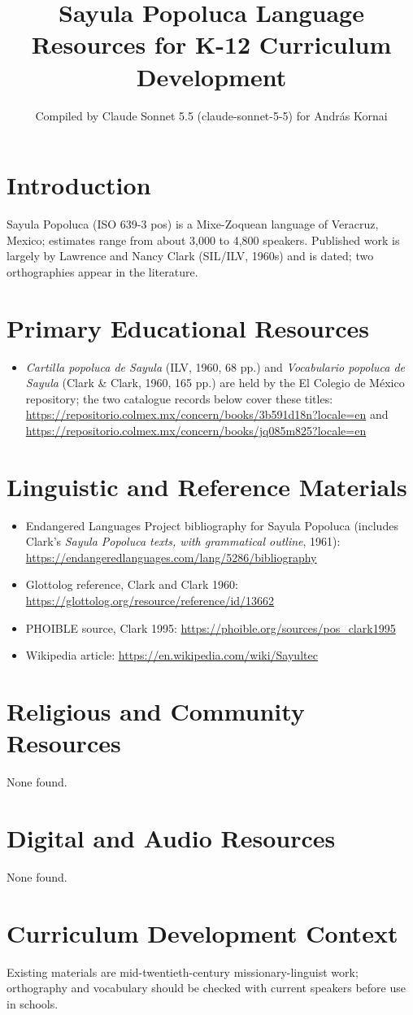 \documentclass[12pt]{article}
\title{Sayula Popoluca Language Resources for K-12 Curriculum Development}
\author{Compiled by Claude Sonnet 5.5 (claude-sonnet-5-5) for Andr\'as Kornai}
\date{}
\begin{document}
\maketitle
\section{Introduction}
Sayula Popoluca (ISO 639-3 pos) is a Mixe-Zoquean language of Veracruz, Mexico; estimates range from about 3,000 to 4,800 speakers. Published work is largely by Lawrence and Nancy Clark (SIL/ILV, 1960s) and is dated; two orthographies appear in the literature.
\section{Primary Educational Resources}
\begin{itemize}
\item \emph{Cartilla popoluca de Sayula} (ILV, 1960, 68 pp.) and \emph{Vocabulario popoluca de Sayula} (Clark \& Clark, 1960, 165 pp.) are held by the El Colegio de M\'exico repository; the two catalogue records below cover these titles: \url{https://repositorio.colmex.mx/concern/books/3b591d18n?locale=en} and \url{https://repositorio.colmex.mx/concern/books/jq085m825?locale=en}
\end{itemize}
\section{Linguistic and Reference Materials}
\begin{itemize}
\item Endangered Languages Project bibliography for Sayula Popoluca (includes Clark's \emph{Sayula Popoluca texts, with grammatical outline}, 1961): \url{https://endangeredlanguages.com/lang/5286/bibliography}
\item Glottolog reference, Clark and Clark 1960: \url{https://glottolog.org/resource/reference/id/13662}
\item PHOIBLE source, Clark 1995: \url{https://phoible.org/sources/pos_clark1995}
\item Wikipedia article: \url{https://en.wikipedia.com/wiki/Sayultec}
\end{itemize}
\section{Religious and Community Resources}
None found.
\section{Digital and Audio Resources}
None found.
\section{Curriculum Development Context}
Existing materials are mid-twentieth-century missionary-linguist work; orthography and vocabulary should be checked with current speakers before use in schools.
\end{document}
